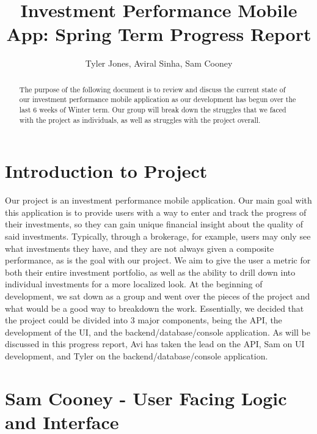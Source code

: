 \documentclass[letterpaper,10pt,titlepage,journal,compsoc,draftclsnofoot,onecolumn]{IEEEtran}
\title{Investment Performance Mobile App: Spring Term Progress Report}
\author{Tyler Jones, Aviral Sinha, Sam Cooney}
\newcommand\tab[1][1cm]{\hspace*{#1}}
\begin{document}
\begin{titlingpage}
    \maketitle
	\centering{}
    \begin{abstract}
        
     The purpose of the following document is to review and discuss the current state of our investment performance mobile application as our development has begun over the last 6 weeks of Winter term. Our group will break down the struggles that we faced with the project as individuals, as well as struggles with the project overall.
        
    \end{abstract}
\end{titlingpage}

\newpage

\tableofcontents{}

\newpage

\section{Introduction to Project}

\tab Our project is an investment performance mobile application. Our main goal with this application is to provide users with a way to enter and track the progress of their investments, so they can gain unique financial insight about the quality of said investments. Typically, through a brokerage, for example, users may only see what investments they have, and they are not always given a composite performance, as is the goal with our project. We aim to give the user a metric for both their entire investment portfolio, as well as the ability to drill down into individual investments for a more localized look. At the beginning of development, we sat down as a group and went over the pieces of the project and what would be a good way to breakdown the work. Essentially, we decided that the project could be divided into 3 major components, being the API, the development of the UI, and the backend/database/console application. As will be discussed in this progress report, Avi has taken the lead on the API, Sam on UI development, and Tyler on the backend/database/console application.

\section{Sam Cooney - User Facing Logic and Interface}
\end{document}
